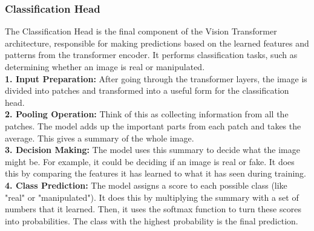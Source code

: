 \subsubsection{Classification Head}
The Classification Head is the final component of the Vision Transformer architecture, responsible for making predictions based on the learned features and patterns from the transformer encoder. It performs classification tasks, such as determining whether an image is real or manipulated.
\\

\noindent \textbf{1. Input Preparation:} After going through the transformer layers, the image is divided into patches and transformed into a useful form for the classification head.
\\

\noindent \textbf{2. Pooling Operation:} Think of this as collecting information from all the patches. The model adds up the important parts from each patch and takes the average. This gives a summary of the whole image.
\\

\noindent \textbf{3. Decision Making:} The model uses this summary to decide what the image might be. For example, it could be deciding if an image is real or fake. It does this by comparing the features it has learned to what it has seen during training.
\\

\noindent \textbf{4. Class Prediction:} The model assigns a score to each possible class (like "real" or "manipulated"). It does this by multiplying the summary with a set of numbers that it learned. Then, it uses the softmax function to turn these scores into probabilities. The class with the highest probability is the final prediction.


\newpage
